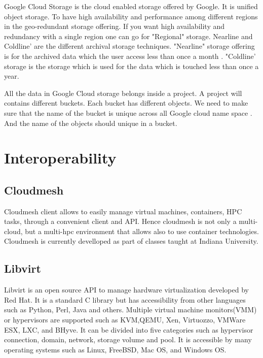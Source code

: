      Google Cloud Storage is the cloud enabled storage offered by
     Google. \cite{www-google-cloud-storage} It is unified object
     storage. To have high availability and performance among
     different regions in the geo-redundant storage offering. If you
     want high availability and redundancy with a single region one
     can go for "Regional" storage. Nearline and Coldline’ are the
     different archival storage techniques. "Nearline" storage
     offering is for the archived data which the user access less than
     once a month . "Coldline’ storage is the storage which is used
     for the data which is touched less than once a year.

     All the data in Google Cloud storage belongs inside a project. A
     project will contains different buckets. Each bucket has
     different objects. We need to make sure that the name of the
     bucket is unique across all Google cloud name space . And the
     name of the objects should unique in a bucket.


\section{Interoperability}
\label{S:o-interoperability}


\subsection{Cloudmesh}

Cloudmesh client allows to easily manage virtual machines, containers,
HPC tasks, through a convenient client and API. Hence cloudmesh is not
only a multi-cloud, but a multi-hpc environment that allows also to
use container technologies. Cloudmesh is currently develloped as part
of classes taught at Indiana University.

\subsection{Libvirt \cv}

     Libvirt is an open source API to manage hardware virtualization
     developed by Red Hat.  It is a standard C library but has
     accessibility from other languages such as Python, Perl, Java and
     others. \cite{www-libvirt} Multiple virtual machine
     monitors(VMM) or hypervisors are supported such as KVM,QEMU, Xen,
     Virtuozzo, VMWare ESX, LXC, and BHyve.  It can be divided into
     five categories such as hypervisor connection, domain, network,
     storage volume and pool.  \cite{www-ibm} It is accessible by
     many operating systems such as Linux, FreeBSD, Mac OS, and
     Windows OS.
     
